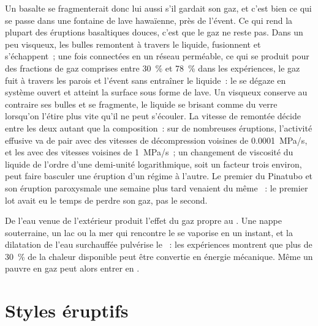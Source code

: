 Un basalte se fragmenterait donc lui aussi s'il gardait son gaz, et c'est bien ce qui se passe
dans une fontaine de lave hawaïenne, près de l'évent. Ce qui rend la plupart des éruptions basaltiques
douces, c'est que le gaz ne reste pas. Dans un  peu visqueux, les bulles remontent
à travers le liquide, fusionnent et s'échappent~; une fois connectées en un réseau perméable,
ce qui se produit pour des fractions de gaz comprises entre \qty{30}{\percent} et \qty{78}{\percent}
dans les expériences, le gaz fuit à travers les parois et l'évent sans entraîner le
liquide~: le  se dégaze en système ouvert et atteint la surface sous forme de
lave. Un  visqueux conserve au contraire ses bulles et se fragmente, le liquide se brisant
comme du verre lorsqu'on l'étire plus vite qu'il ne peut s'écouler. La vitesse de remontée décide
entre les deux autant que la composition~: sur de nombreuses éruptions, l'activité effusive
va de pair avec des vitesses de décompression voisines de \qty{0.0001}{MPa/s}, et les 
avec des vitesses voisines de \qty{1}{MPa/s}~; un changement de viscosité du liquide
de l'ordre d'une demi-unité logarithmique, soit un facteur trois environ, peut faire basculer une éruption d'un régime à l'autre.
Le premier  du Pinatubo et son éruption paroxysmale une semaine plus tard
venaient du même ~: le premier lot avait eu le temps de perdre son gaz, pas le second.

De l'eau venue de l'extérieur produit l'effet du gaz propre au . Une nappe souterraine, un lac ou la mer
qui rencontre le  se vaporise en un instant, et la dilatation de l'eau surchauffée
pulvérise le ~: les expériences montrent que plus de \qty{30}{\percent} de la chaleur disponible
peut être convertie en énergie mécanique. Même un  pauvre en gaz peut alors
entrer en .

\section{Styles éruptifs}

